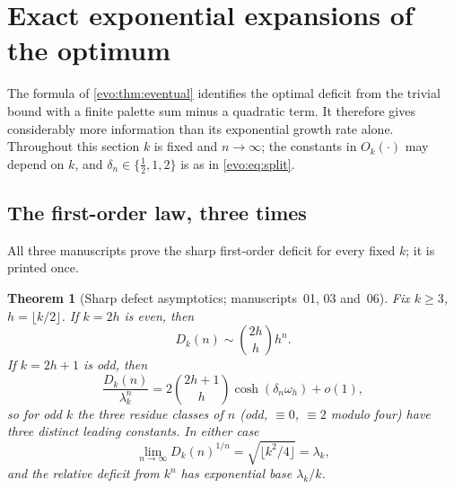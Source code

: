 \documentclass[11pt,a4paper]{article}
\numberwithin{equation}{section}
\newtheorem{theorem}{Theorem}[section]
\theoremstyle{definition}
\theoremstyle{remark}
\begin{document}
\section{Exact exponential expansions of the optimum}\label{evo:sec:asymptotics}

The formula of \cref{evo:thm:eventual} identifies the optimal deficit from
the trivial bound with a finite palette sum minus a quadratic term. It
therefore gives considerably more information than its exponential growth
rate alone. Throughout this section $k$ is fixed and $n\to\infty$; the
constants in $O_k(\cdot)$ may depend on $k$, and $\delta_n\in\{\tfrac12,1,2\}$
is as in \eqref{evo:eq:split}.

\subsection{The first-order law, three times}

All three manuscripts prove the sharp first-order deficit for every fixed
$k$; it is printed once.

\begin{theorem}[Sharp defect asymptotics; manuscripts~01, 03 and~06]\label{evo:thm:firstorder}
Fix $k\ge3$, $h=\lfloor k/2\rfloor$. If $k=2h$ is even, then
\begin{equation}\label{evo:eq:evenfirst}
 D_k(n)\sim\binom{2h}{h}h^n.
\end{equation}
If $k=2h+1$ is odd, then
\begin{equation}\label{evo:eq:oddfirst}
 \frac{D_k(n)}{\lambda_k^n}
 =2\binom{2h+1}{h}\cosh(\delta_n\omega_h)+o(1),
\end{equation}
so for odd $k$ the three residue classes of $n$ (odd, $\equiv0$, $\equiv2$
modulo four) have three distinct leading constants. In either case
\begin{equation}\label{evo:eq:deficitroot}
 \lim_{n\to\infty}D_k(n)^{1/n}=\sqrt{\lfloor k^2/4\rfloor}=\lambda_k,
\end{equation}
and the relative deficit from $k^n$ has exponential base $\lambda_k/k$.
\end{theorem}
\end{document}
